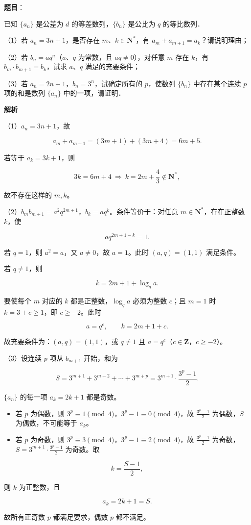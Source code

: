 \begin{answer}

\textbf{题目}：

已知 $\{a_n\}$ 是公差为 $d$ 的等差数列，$\{b_n\}$ 是公比为 $q$ 的等比数列．

（1）若 $a_n=3n+1$，是否存在 $m$、$k\in\mathbf N^*$，有 $a_m+a_{m+1}=a_k$？请说明理由；

（2）若 $b_n=aq^n$（$a$、$q$ 为常数，且 $aq\neq0$），对任意 $m$ 存在 $k$，有 $b_m\cdot b_{m+1}=b_k$，试求 $a$、$q$ 满足的充要条件；

（3）若 $a_n=2n+1$，$b_n=3^n$，试确定所有的 $p$，使数列 $\{b_n\}$ 中存在某个连续 $p$ 项的和是数列 $\{a_n\}$ 中的一项，请证明．

\textbf{解析}

（1）$a_n=3n+1$，故

\nopagebreak[4]
\[a_m+a_{m+1}=(3m+1)+(3m+4)=6m+5 .\]

若等于 $a_k=3k+1$，则

\nopagebreak[4]
\[3k=6m+4\ \Longrightarrow\ k=2m+\frac43\notin\mathbf N^*,\]

故不存在这样的 $m,k$。

（2）$b_mb_{m+1}=a^2q^{2m+1}$，$b_k=aq^k$。条件等价于：对任意 $m\in\mathbf N^*$，存在正整数 $k$，使

\nopagebreak[4]
\[aq^{2m+1-k}=1 .\]

若 $q=1$，则 $a^2=a$，又 $a\neq0$，故 $a=1$。此时 $(a,q)=(1,1)$ 满足条件。

若 $q\neq1$，则

\nopagebreak[4]
\[k=2m+1+\log_q a .\]

要使每个 $m$ 对应的 $k$ 都是正整数，$\log_q a$ 必须为整数 $c$；且 $m=1$ 时 $k=3+c\geqslant1$，即 $c\geqslant-2$。此时

\nopagebreak[4]
\[a=q^c,\qquad k=2m+1+c .\]

故充要条件为：$(a,q)=(1,1)$，或 $q\neq1$ 且 $a=q^c$（$c\in\mathbf Z$，$c\geqslant-2$）。

（3）设连续 $p$ 项从 $b_{m+1}$ 开始，和为

\nopagebreak[4]
\[S=3^{m+1}+3^{m+2}+\cdots+3^{m+p}
=3^{m+1}\cdot\frac{3^p-1}{2}.\]

$\{a_n\}$ 的每一项 $a_k=2k+1$ 都是奇数。

\begin{itemize}
\item 若 $p$ 为偶数，则 $3^p\equiv1\pmod4$，$3^p-1\equiv0\pmod4$，故 $\frac{3^p-1}{2}$ 为偶数，$S$ 为偶数，不可能等于 $a_k$。
\item 若 $p$ 为奇数，则 $3^p\equiv3\pmod4$，$3^p-1\equiv2\pmod4$，故 $\frac{3^p-1}{2}$ 为奇数，$S=3^{m+1}\cdot\frac{3^p-1}{2}$ 为奇数。取
\end{itemize}

\nopagebreak[4]
\[k=\frac{S-1}{2},\]

则 $k$ 为正整数，且

\nopagebreak[4]
\[a_k=2k+1=S .\]

故所有正奇数 $p$ 都满足要求，偶数 $p$ 都不满足。


\end{answer}